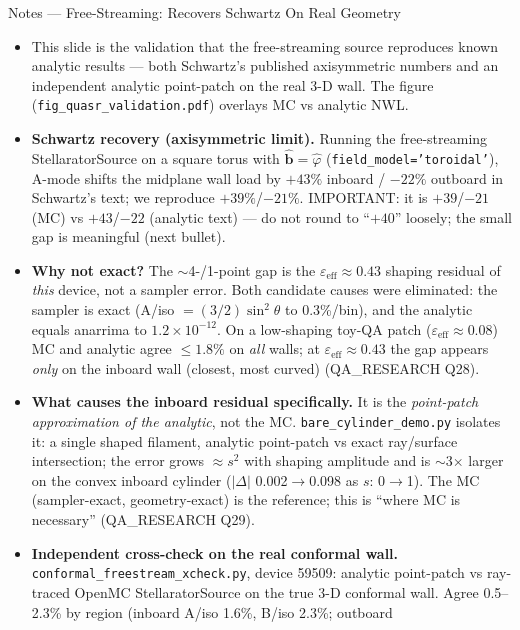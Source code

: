 \documentclass[11pt,aspectratio=169]{beamer}
\newcommand{\bhat}{\hat{\mathbf{b}}}
\begin{document}
\begin{frame}[allowframebreaks]{Notes --- Free-Streaming: Recovers Schwartz On Real Geometry}
{\color{red}\footnotesize
\begin{itemize}
\item This slide is the validation that the free-streaming source reproduces known analytic results
      --- both Schwartz's published axisymmetric numbers and an independent analytic point-patch on
      the real 3-D wall. The figure (\texttt{fig\_quasr\_validation.pdf}) overlays MC vs analytic NWL.
\item \textbf{Schwartz recovery (axisymmetric limit).} Running the free-streaming StellaratorSource on
      a square torus with $\bhat=\hat\varphi$ (\texttt{field\_model='toroidal'}), A-mode shifts the
      midplane wall load by $+43\%$ inboard / $-22\%$ outboard in Schwartz's text; we reproduce
      $+39\%$/$-21\%$. IMPORTANT: it is $+39$/$-21$ (MC) vs $+43$/$-22$ (analytic text) --- do not
      round to ``$+40$'' loosely; the small gap is meaningful (next bullet).
\item \textbf{Why not exact?} The $\sim$4-/1-point gap is the $\varepsilon_\text{eff}\approx0.43$
      shaping residual of \emph{this} device, not a sampler error. Both candidate causes were
      eliminated: the sampler is exact (A/iso $=(3/2)\sin^2\theta$ to 0.3\%/bin), and the analytic
      equals anarrima to $1.2\times10^{-12}$. On a low-shaping toy-QA patch ($\varepsilon_\text{eff}
      \approx0.08$) MC and analytic agree $\le1.8\%$ on \emph{all} walls; at $\varepsilon_\text{eff}
      \approx0.43$ the gap appears \emph{only} on the inboard wall (closest, most curved)
      (QA\_RESEARCH Q28).
\item \textbf{What causes the inboard residual specifically.} It is the \emph{point-patch
      approximation of the analytic}, not the MC. \texttt{bare\_cylinder\_demo.py} isolates it: a
      single shaped filament, analytic point-patch vs exact ray/surface intersection; the error grows
      $\approx s^2$ with shaping amplitude and is $\sim$3$\times$ larger on the convex inboard
      cylinder ($|\Delta|$ 0.002$\to$0.098 as $s$: 0$\to$1). The MC (sampler-exact, geometry-exact) is
      the reference; this is ``where MC is necessary'' (QA\_RESEARCH Q29).
\item \textbf{Independent cross-check on the real conformal wall.} \texttt{conformal\_freestream\_xcheck.py},
      device 59509: analytic point-patch vs ray-traced OpenMC StellaratorSource on the true 3-D
      conformal wall. Agree 0.5--2.3\% by region (inboard A/iso 1.6\%, B/iso 2.3\%; outboard

\end{itemize}}
\end{frame}
\end{document}
